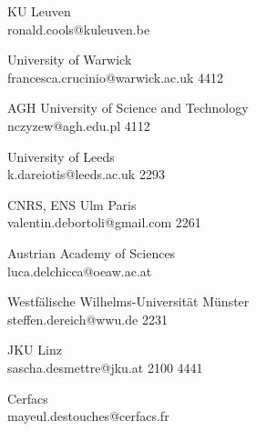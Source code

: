 \begin{multicols}{2}
 {KU Leuven\\}%
 {ronald.cools@kuleuven.be}%
 {} %
 {} %
 {} %
 {} %
 {} %

 {University of Warwick\\}%
 {francesca.crucinio@warwick.ac.uk}%
 {4412} %
 {} %
 {} %
 {} %
 {} %

 {AGH University of Science and Technology\\}%
 {nczyzew@agh.edu.pl}%
 {4112} %
 {} %
 {} %
 {} %
 {} %

 {University of Leeds\\}%
 {k.dareiotis@leeds.ac.uk}%
 {2293} %
 {} %
 {} %
 {} %
 {} %

 {CNRS, ENS Ulm Paris\\}%
 {valentin.debortoli@gmail.com}%
 {2261} %
 {} %
 {} %
 {} %
 {} %

 {Austrian Academy of Sciences\\}%
 {luca.delchicca@oeaw.ac.at}%
 {} %
 {} %
 {} %
 {} %
 {} %

 {Westf\"alische Wilhelms-Universit\"at M\"unster\\}%
 {steffen.dereich@wwu.de}%
 {2231} %
 {} %
 {} %
 {} %
 {} %

 {JKU Linz\\}%
 {sascha.desmettre@jku.at}%
 {2100} %
 {4441} %
 {} %
 {} %
 {} %

 {Cerfacs\\}%
 {mayeul.destouches@cerfacs.fr}%
 {} %
 {} %
 {} %
 {} %
 {} %


\end{multicols}
